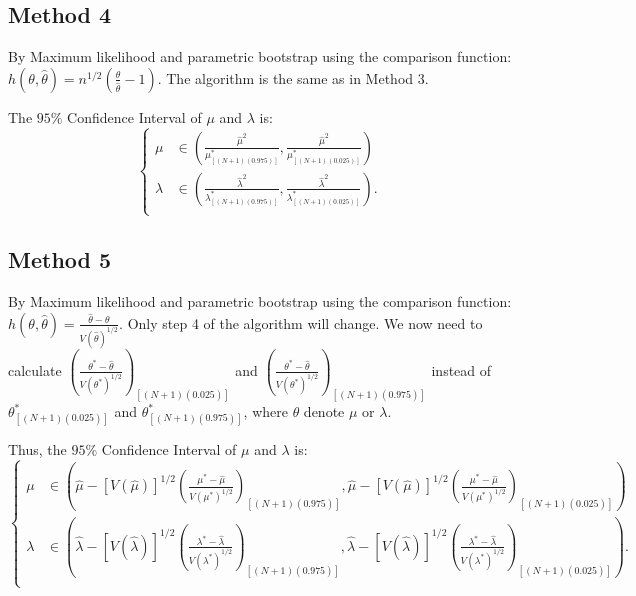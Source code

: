 \documentclass[12pt]{article}
\begin{document}
\subsection{Method 4}
By Maximum likelihood and parametric bootstrap using the comparison function: $h(\theta,\hat{\theta})=n^{1/2}(\frac{\theta}{\hat{\theta}}-1)$. The algorithm is the same as in Method 3.

The $95\%$ Confidence Interval of $\mu$ and $\lambda$ is: 
 \begin{equation*}
\left\{                         
\begin{aligned}
\mu &\in (\frac{\hat{\mu}^2}{\mu_{[(N+1)(0.975)]}^{*}},\frac{\hat{\mu}^2}{\mu_{[(N+1)(0.025)]}^{*}})\\
\lambda &\in (\frac{\hat{\lambda}^2}{\lambda_{[(N+1)(0.975)]}^{*}},\frac{\hat{\lambda}^2}{\lambda_{[(N+1)(0.025)]}^{*}}).\\
\end{aligned}
\right.
\end{equation*}



\subsection{Method 5}
By Maximum likelihood and parametric bootstrap using the comparison function: $h(\theta,\hat{\theta})=\frac{\hat{\theta}-\theta}{V(\hat{\theta})^{1/2}}$. Only step 4 of the algorithm will change. We now need to calculate $(\frac{\theta^{*}-\hat{\theta}}{V(\theta^{*})^{1/2}})_{[(N+1)(0.025)]}$ and $(\frac{\theta^{*}-\hat{\theta}}{V(\theta^{*})^{1/2}})_{[(N+1)(0.975)]}$ instead of $\theta^{*}_{[(N+1)(0.025)]}$ and $\theta^{*}_{[(N+1)(0.975)]}$, where $\theta$ denote $\mu$ or $\lambda$.

Thus, the $95\%$ Confidence Interval of $\mu$ and $\lambda$ is: 
 \begin{equation*}
\left\{                         
\begin{aligned}
\mu &\in (\hat{\mu}-[V(\hat{\mu})]^{1/2}(\frac{\mu^{*}-\hat{\mu}}{V(\mu^{*})^{1/2}})_{[(N+1)(0.975)]},\hat{\mu}-[V(\hat{\mu})]^{1/2}(\frac{\mu^{*}-\hat{\mu}}{V(\mu^{*})^{1/2}})_{[(N+1)(0.025)]})\\
\lambda &\in (\hat{\lambda}-[V(\hat{\lambda})]^{1/2}(\frac{\lambda^{*}-\hat{\lambda}}{V(\lambda^{*})^{1/2}})_{[(N+1)(0.975)]},\hat{\lambda}-[V(\hat{\lambda})]^{1/2}(\frac{\lambda^{*}-\hat{\lambda}}{V(\lambda^{*})^{1/2}})_{[(N+1)(0.025)]}).\\
\end{aligned}
\right.
\end{equation*}
\end{document}

